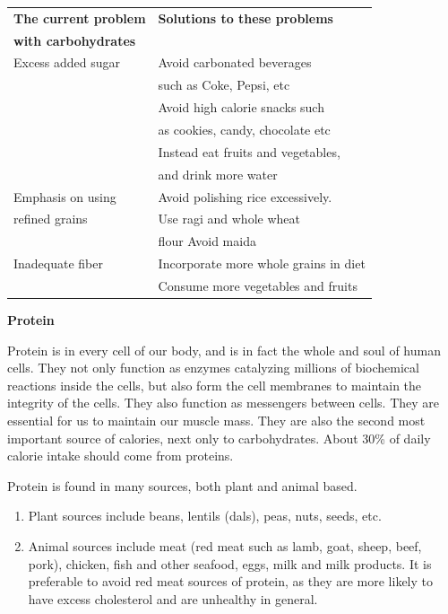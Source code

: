\begin{center}
\begin{tabular}{|l|l|}
\hline
\textbf{The current problem} & \textbf{Solutions to these problems}\\
\textbf{with carbohydrates} &\\
\hline
Excess added sugar & Avoid carbonated beverages\\
 & such as Coke, Pepsi, etc\\
 & Avoid high calorie snacks such\\
 & as cookies, candy, chocolate etc\\
 & Instead eat fruits and vegetables,\\
 & and drink more water\\
\hline
Emphasis on using & Avoid polishing rice excessively.\\
refined grains & Use ragi and whole wheat\\
 & flour Avoid maida\\
\hline
Inadequate fiber & Incorporate more whole grains in diet\\
 & Consume more vegetables and fruits\\
\hline
\end{tabular}
\end{center}

\noindent\textbf{Protein}

Protein is in every cell of our body, and is in fact the whole and soul of human cells. They not only function as enzymes catalyzing millions of biochemical reactions inside the cells, but also form the cell membranes to maintain the integrity of the cells. They also function as messengers between cells. They are essential for us to maintain our muscle mass. They are also the second most important source of calories, next only to carbohydrates. About 30\% of daily calorie intake should come from proteins.

\noindent Protein is found in many sources, both plant and animal based.

\begin{enumerate}[\ding{118}]
\itemsep=0pt
\item Plant sources include beans, lentils (dals), peas, nuts, seeds, etc.
\item Animal sources include meat (red meat such as lamb, goat, sheep, beef, pork), chicken, fish and other seafood, eggs, milk and milk products. It is preferable to avoid red meat sources of protein, as they are more likely to have excess cholesterol and are unhealthy in general.
\end{enumerate}

